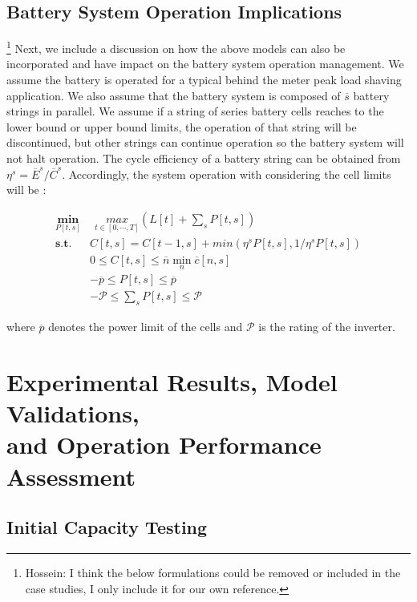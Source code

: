 \documentclass[10pt,twocolumn]{IEEEtran}
\begin{document}
\subsection{Battery System Operation  Implications}
\footnote{Hossein: I think the below formulations could be removed or included in the case studies, I only include it for our own reference.}
Next, we include a discussion on how the above models can also be incorporated and have impact on the battery system operation management. 
We assume the battery is operated for a typical behind the meter peak load shaving application.
We also assume that the battery system is composed of $\overline{s}$   battery strings in parallel.
We assume if a string of series battery cells reaches to the lower bound or upper bound limits, the operation of that string will be discontinued, but other strings can continue operation so the battery system will not halt operation.
The cycle efficiency of a battery string can be obtained from $ \eta^s= \overline{E}^s/\overline{C}^s$.
Accordingly, the system operation with considering the cell limits will be :

\begin{equation}
\begin{split}
\underset{P[t,s]}{ \mathbf{min}}  &\ \  \underset{t \in [0,\cdots,T]}{max}(  L[t]+ \sum_s P[t,s] ) \\
\mathbf{s.t.}  \ \    &C[t,s]= C[t-1,s] + min( \eta^s P[t,s], 1/\eta^s P[t,s])  \\
& 0 \leq   C[t,s] \leq \overline{n} \min_{n} \overline{c}[n,s] \\
& - \overline{p} \leq  P[t,s]  \leq  \overline{p} \\
& - \mathcal{P} \leq \sum_s  P[t,s]  \leq \mathcal{P}
\end{split}
\end{equation}

\noindent where $\overline{p}$ denotes the  power limit of the cells and $\mathcal{P}$ is the rating of the inverter.

\section{Experimental Results, Model Validations,\\ and Operation Performance Assessment} \label{sec:results}


\subsection{Initial Capacity Testing} \label{sec:capacity_test_1}
\end{document}
